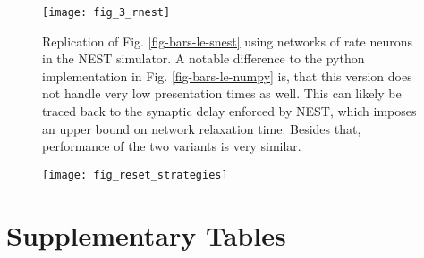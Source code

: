 \begin{figure}[h!]
  \centering
  \texttt{[image: fig\_3\_rnest]}
  \caption[Replication of Fig. \ref{fig-bars-le-snest} using networks of rate neurons in the NEST simulator]{Replication
    of Fig. \ref{fig-bars-le-snest} using networks of rate neurons in the NEST simulator. A notable difference to the
    python implementation in Fig. \ref{fig-bars-le-numpy} is, that this version does not handle very low presentation
    times as well. This can likely be traced back to the synaptic delay enforced by NEST, which imposes an upper bound
    on network relaxation time. Besides that, performance of the two variants is very similar.}
  \label{fig-bars-le-rnest}
\end{figure}


\begin{figure}[h!]
  \centering
  \texttt{[image: fig\_reset\_strategies]}
  \caption[Replication of Fig. \ref{fig-bars-le-snest} using networks of rate neurons in the NEST simulator]{}
  \label{fig-bars-le-rnest}
\end{figure}




\clearpage

\section{Supplementary Tables}



\renewcommand{\thetable}{S\arabic{table}}


